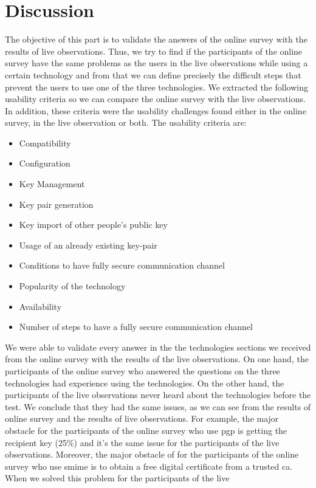 \section{Discussion}
The objective of this part is to validate the answers of the online survey with the results of live observations. Thus, we try to find if the participants of the online survey have the same problems as the users in the live observations while using a certain technology and from that we can define precisely the difficult steps that prevent the users to use one of the three technologies. We extracted the following usability criteria so we can compare the online survey with the live observations. In addition, these criteria were the usability challenges found either in the online survey, in the live observation or both. The usability criteria are:
\begin{itemize}
	\item Compatibility
	\item Configuration
	\item Key Management
	\item Key pair generation
	\item Key import of other people’s public key
	\item Usage of an already existing key-pair
	\item Conditions to have fully secure communication channel
	\item Popularity of the technology
	\item Availability
	\item Number of steps to have a fully secure communication channel
\end{itemize}
We were able to validate every answer in the the technologies sections we received from the online survey with the results of the live observations. On one hand, the participants of the online survey who answered the questions on the three technologies had experience using the technologies. On the other hand, the participants of the live observations never heard about the technologies before the test. We conclude that they had the same issues, as we can see from the results of online survey and the results of live observations. For example, the major obstacle
for the participants of the online survey who use \acrshort{pgp} is getting the recipient key (25\%) and it's the same issue for the participants of the live observations. Moreover, the major obstacle of for the participants of the online survey who use \acrshort{smime} is to obtain a free digital certificate from a trusted \acrlong{ca}. When we solved this problem for the participants of the live
